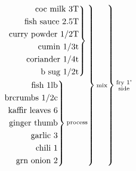 \documentclass[12pt]{standalone}
\begin{document}
\[
\begin{rcases}\begin{alignedat}{3}
\begin{rcases}\begin{alignedat}{3}
\begin{rcases}\begin{alignedat}{3}
\text{coc milk 3T}\\
\text{fish sauce 2.5T}\\
\text{curry powder 1/2T}\\
\text{cumin 1/3t}\\
\text{coriander 1/4t}\\
\text{b sug 1/2t}\\
\end{alignedat}\end{rcases}
\substack{\text{}}\\
\begin{rcases}\begin{alignedat}{3}
\text{fish 1lb}\\
\text{brcrumbs 1/2c}\\
\text{kaffir leaves 6}\\
\text{ginger thumb}\\
\text{garlic 3}\\
\text{chili 1}\\
\text{grn onion 2}\\
\end{alignedat}\end{rcases}
\substack{\text{process}}\\
\end{alignedat}\end{rcases}
\substack{\text{mix}}\\
\end{alignedat}\end{rcases}
\substack{\text{fry 1'}\\\text{side}}\\
\]
\end{document}
